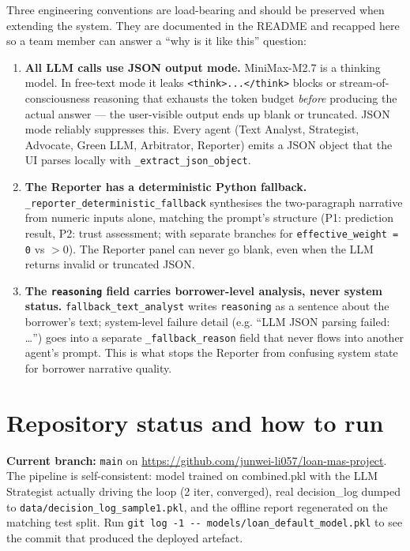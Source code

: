 \documentclass[11pt,letterpaper]{article}
\begin{document}
Three engineering conventions are load-bearing and should be preserved
when extending the system. They are documented in the README and recapped
here so a team member can answer a ``why is it like this'' question:

\begin{enumerate}
  \item \textbf{All LLM calls use JSON output mode.}
        MiniMax-M2.7 is a thinking model. In free-text mode it leaks
        \texttt{<think>...</think>} blocks or stream-of-consciousness
        reasoning that exhausts the token budget \emph{before} producing
        the actual answer --- the user-visible output ends up blank or
        truncated. JSON mode reliably suppresses this. Every agent
        (Text Analyst, Strategist, Advocate, Green LLM, Arbitrator,
        Reporter) emits a JSON object that the UI parses locally with
        \texttt{\_extract\_json\_object}.
  \item \textbf{The Reporter has a deterministic Python fallback.}
        \texttt{\_reporter\_deterministic\_fallback} synthesises the
        two-paragraph narrative from numeric inputs alone, matching the
        prompt's structure (P1: prediction result, P2: trust assessment;
        with separate branches for \texttt{effective\_weight = 0} vs
        $>0$). The Reporter panel can never go blank, even when the LLM
        returns invalid or truncated JSON.
  \item \textbf{The \texttt{reasoning} field carries borrower-level
        analysis, never system status.}
        \texttt{fallback\_text\_analyst} writes \texttt{reasoning} as a
        sentence about the borrower's text; system-level failure detail
        (e.g. ``LLM JSON parsing failed: \ldots'') goes into a separate
        \texttt{\_fallback\_reason} field that never flows into another
        agent's prompt. This is what stops the Reporter from confusing
        system state for borrower narrative quality.
\end{enumerate}

\section{Repository status and how to run}

\textbf{Current branch:} \texttt{main} on
\url{https://github.com/junwei-li057/loan-mas-project}. The pipeline is
self-consistent: model trained on combined.pkl with the LLM Strategist
actually driving the loop (2 iter, converged), real decision\_log dumped
to \texttt{data/decision\_log\_sample1.pkl}, and the offline report
regenerated on the matching test split. Run
\texttt{git log -1 -{}- models/loan\_default\_model.pkl}
to see the commit that produced the deployed artefact.
\end{document}
